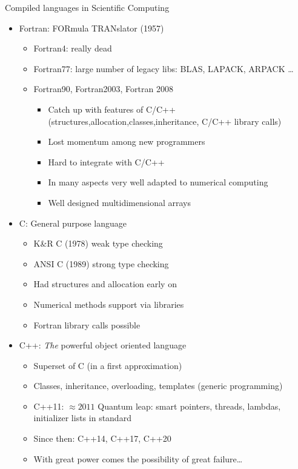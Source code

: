 \begin{frame}{Compiled languages in Scientific Computing}

  \begin{itemize}
    \tightlist
  \item
    Fortran: FORmula TRANslator (1957)

    \begin{itemize}
      \tightlist
    \item
      Fortran4: really dead
    \item
      Fortran77: large number of legacy libs: BLAS, LAPACK, ARPACK
      \ldots{}
    \item
      Fortran90, Fortran2003, Fortran 2008

      \begin{itemize}
        \tightlist
      \item
        Catch up with features of C/C++
        (structures,allocation,classes,inheritance, C/C++ library calls)
      \item
        Lost momentum among new programmers
      \item
        Hard to integrate with C/C++
      \item
        In many aspects very well adapted to numerical computing
      \item
        Well designed multidimensional arrays
      \end{itemize}
    \end{itemize}
  \item
    C: General purpose language

    \begin{itemize}
      \tightlist
    \item
      K\&R C (1978) weak type checking
    \item
      ANSI C (1989) strong type checking
    \item
      Had structures and allocation early on
    \item
      Numerical methods support via libraries
    \item
      Fortran library calls possible
    \end{itemize}
  \item
    C++: \emph{The} powerful object oriented language

    \begin{itemize}
      \tightlist
    \item
      Superset of C (in a first approximation)
    \item
      Classes, inheritance, overloading, templates (generic programming)
    \item
      C++11: $\approx 2011$ Quantum leap: smart pointers, threads, lambdas, initializer
      lists in standard
    \item Since then: C++14, C++17, C++20
    \item
      With great power comes the possibility of great failure\ldots{}
    \end{itemize}
  \end{itemize}

\end{frame}

